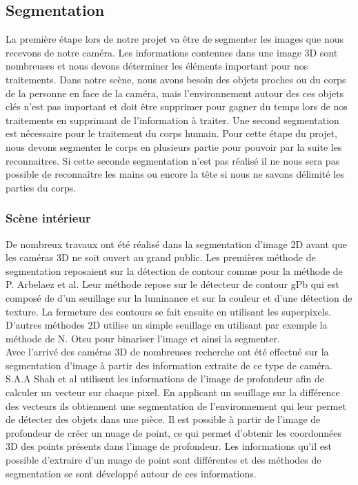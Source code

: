 \subsection{Segmentation}
La première étape lors de notre projet va être de segmenter les images que nous recevons de 
notre caméra. Les informations contenues dans une image 3D sont nombreuses et nous devons
déterminer les éléments important pour nos traitements. Dans notre scène,
nous avons besoin des objets proches ou du corps de la personne en face de la caméra, mais 
l'environnement autour des ces objets clés n'est pas important et doit être supprimer pour
gagner du temps lors de nos traitements en supprimant de l'information à traiter.
Une second segmentation est nécessaire pour le traitement du corps humain. Pour cette étape du projet,
nous devons segmenter le corps en plusieurs partie pour pouvoir par la suite les reconnaitres. Si cette
seconde segmentation n'est pas réalisé il ne nous sera pas possible de reconnaître les mains ou encore
la tête si nous ne savons délimité les parties du corps.  
 
\subsubsection{Scène intérieur}
De nombreux travaux ont été réalisé dans la segmentation d'image 2D avant que les caméras 3D ne soit
ouvert au grand public. Les premières méthode de segmentation reposaient sur la détection de contour
comme pour la méthode de P. Arbelaez et al\cite{2DSegmentation1}. Leur méthode repose sur le détecteur
de contour gPb qui est composé de d'un seuillage sur la luminance et sur la couleur et d'une détection
de texture. La fermeture des contours se fait ensuite en utilisant les superpixels. D'autres méthodes
2D utilise un simple seuillage en utilisant par exemple la méthode de N. Otsu\cite{Otsu} pour binariser
l'image et ainsi la segmenter.\\

Avec l'arrivé des caméras 3D de nombreuses recherche ont été effectué sur la segmentation d'image à partir
des information extraite de ce type de caméra. S.A.A Shah et al\cite{3DSegmentation1} utilisent les informations
de l'image de profondeur afin de calculer un vecteur sur chaque pixel. En applicant un seuillage sur la différence
des vecteurs ils obtiennent une segmentation de l'environnement qui leur permet de détecter des objets dans une pièce.
Il est possible à partir de l'image de profondeur de créer un nuage de point, ce qui permet d'obtenir les 
coordonnées 3D des points présents dans l'image de profondeur. Les informations qu'il est possible d'extraire
d'un nuage de point sont différentes et des méthodes de segmentation se sont développé autour de ces informations.\\

